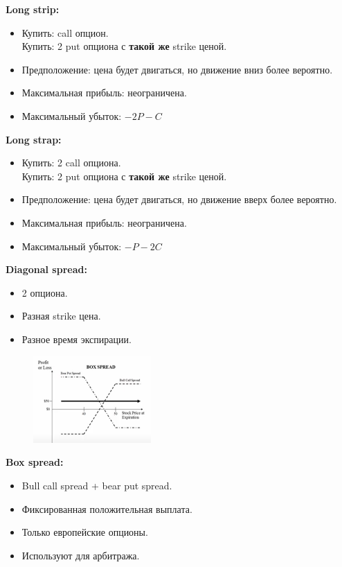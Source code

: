 \documentclass{article}
\begin{document}
 \textbf{Long strip:}
 \begin{itemize}
 \item Купить: call опцион.\\
Купить: 2 put опциона с \textbf{такой же} strike ценой.
\item Предположение: цена будет двигаться, но движение вниз более вероятно.
\item Максимальная прибыль: неограничена.
\item Максимальный убыток: $ -2P - C $
\end{itemize}

 \textbf{Long strap:}
 \begin{itemize}
 \item Купить: 2 call опциона.\\
Купить: 2 put опциона с \textbf{такой же} strike ценой.
\item Предположение: цена будет двигаться, но движение вверх более вероятно.
\item Максимальная прибыль: неограничена.
\item Максимальный убыток: $ -P - 2C $
\end{itemize}

 \textbf{Diagonal spread:}
 \begin{itemize}
 \item 2 опциона.
\item Разная strike цена.
\item Разное время экспирации.
\end{itemize}


\begin{figure}
    \centering    \includegraphics[width=0.4\textwidth]{box.png}
\end{figure}

 \textbf{Box spread:}
 \begin{itemize}
 \item Bull call spread + bear put spread.
\item Фиксированная положительная выплата.
\item Только европейские опционы.
\item Используют для арбитража.
\end{itemize}
\end{document}
